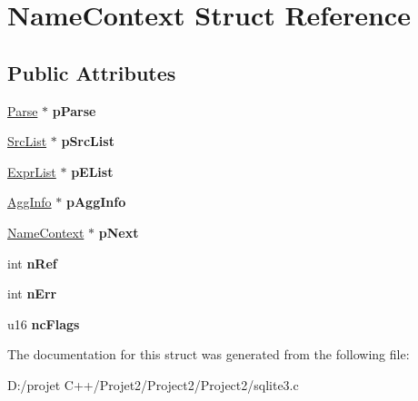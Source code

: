 \hypertarget{struct_name_context}{}\section{Name\+Context Struct Reference}
\label{struct_name_context}
\subsection*{Public Attributes}
\begin{DoxyCompactItemize}
\item 
\mbox{\label{struct_name_context_a14635249bf75d5e18124089571dd2386}} 
\mbox{\hyperlink{struct_parse}{Parse}} $\ast$ {\bfseries p\+Parse}
\item 
\mbox{\label{struct_name_context_a6ede21da33e2e9bd3d0c5fe90a3ec72c}} 
\mbox{\hyperlink{struct_src_list}{Src\+List}} $\ast$ {\bfseries p\+Src\+List}
\item 
\mbox{\label{struct_name_context_a8c752d7fb9b28179156c569cc57ba6f2}} 
\mbox{\hyperlink{struct_expr_list}{Expr\+List}} $\ast$ {\bfseries p\+E\+List}
\item 
\mbox{\label{struct_name_context_aeb3ff72c03dd770d421cadc2195a5644}} 
\mbox{\hyperlink{struct_agg_info}{Agg\+Info}} $\ast$ {\bfseries p\+Agg\+Info}
\item 
\mbox{\label{struct_name_context_a82ce0ec8a3cc3d792e1f38bb5e0ad5fc}} 
\mbox{\hyperlink{struct_name_context}{Name\+Context}} $\ast$ {\bfseries p\+Next}
\item 
\mbox{\label{struct_name_context_ad68616ce2a58fa1b135e0dcf953bdc97}} 
int {\bfseries n\+Ref}
\item 
\mbox{\label{struct_name_context_aba0b89b42e945c4c96d57a8fe011329c}} 
int {\bfseries n\+Err}
\item 
\mbox{\label{struct_name_context_af1721ec037371cabc7385822cbd9629a}} 
u16 {\bfseries nc\+Flags}
\end{DoxyCompactItemize}


The documentation for this struct was generated from the following file\+:\begin{DoxyCompactItemize}
\item 
D\+:/projet C++/\+Projet2/\+Project2/\+Project2/sqlite3.\+c\end{DoxyCompactItemize}
